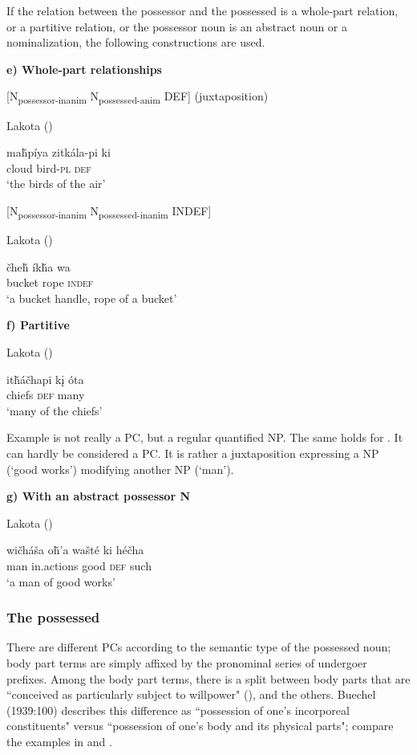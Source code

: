 \documentclass[output=paper]{LSP/langsci}
\begin{document}
If the relation between the possessor and the possessed is a whole-part relation, or a partitive relation, or the possessor noun is an abstract noun or a nominalization, the following constructions are used. 

\vspace{1em}
\textbf{e)	Whole-part relationships}

[N\textsubscript{possessor-inanim} N\textsubscript{possessed-anim} DEF] (juxtaposition)

\ea Lakota (\citealt[92]{Buechel1939})

\gll ma\v{h}píya zitkála-pi  ki  \\
cloud      bird-\textsc{pl} \textsc{def} \\
\glt `the birds of the air'
\z

[N\textsubscript{possessor-inanim} N\textsubscript{possessed-inanim} INDEF] 

\ea Lakota (\citealt[92]{Buechel1939})

\gll  \v{c}he\v{h} \'ik\v{h}a wa \\  
bucket rope \textsc{indef} \\
\glt `a bucket handle, rope of a bucket' 
\z 

\textbf{f)	Partitive}

\ea Lakota (\citealt[93]{Buechel1939}) \label{lakotamanychiefs}

\gll it\v{h}\'a\v{c}hapi k\k{i} \'ota \\
chiefs \textsc{def} many \\
\glt `many of the chiefs'
\z

Example  is not really a PC, but a regular quantified NP. The same holds for . It can hardly be considered a PC. It is rather a juxtaposition expressing a NP (`good works') modifying another NP (`man').

\vspace{1em}

\textbf{g)	With an abstract possessor N}

\ea Lakota (\citealt[93]{Buechel1939}) \label{lakotagoodworks}

\gll wi\v{c}háša o\v{h}'a     wašté ki     hé\v{c}ha \\
man       in.actions good  \textsc{def} such \\
\glt `a man of good works'
\z

\subsubsection{The possessed}
There are different PCs according to the semantic type of the possessed noun; body part terms are simply affixed by the pronominal series of undergoer prefixes. Among the body part terms, there is a split between body parts that are ``conceived as particularly subject to willpower" (\citealt[128]{BoasDeloria1941}), and the others. Buechel (1939:100) describes this difference as ``possession of one's incorporeal constituents" versus ``possession of one's body and its physical parts"; compare the examples in  and .
\end{document}
